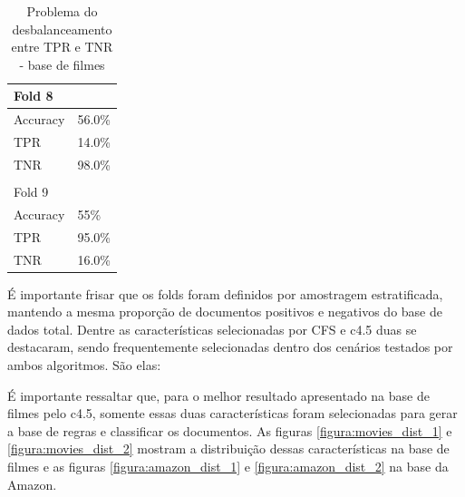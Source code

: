 \documentclass[template.tex]{subfiles}
\begin{document}
\begin{table}[H]
\begin{tabular}{ll}
	Fold 8 \\ \hline
    Accuracy &  56.0\% \\
	TPR &  14.0\% \\
	TNR &  98.0\% \\ \\
	
	Fold 9 \\ \hline
    Accuracy &  55\% \\
	TPR &  95.0\% \\
	TNR &  16.0\% \\
    \end{tabular}
    \caption{Problema do desbalanceamento entre TPR e TNR - base de filmes}
    \label{table:movie_folds}
\end{table}

É importante frisar que os folds foram definidos por amostragem estratificada, mantendo a mesma proporção de documentos positivos e negativos do base de dados total. Dentre as características selecionadas por CFS e c4.5 duas se destacaram, sendo frequentemente selecionadas dentro dos cenários testados por ambos algoritmos. São elas:

\begin{table}
\caption{Características mais selecionadas entre bases e entre algoritmos de seleção}
\label{table:features_most_selected}
\end{table}

É importante ressaltar que, para o melhor resultado apresentado na base de filmes pelo c4.5, somente essas duas características foram selecionadas para gerar a base de regras e classificar os documentos. As figuras \ref{figura:movies_dist_1} e \ref{figura:movies_dist_2} mostram a distribuição dessas características na base de filmes e as figuras \ref{figura:amazon_dist_1} e \ref{figura:amazon_dist_2} na base da Amazon. 
\end{document}
